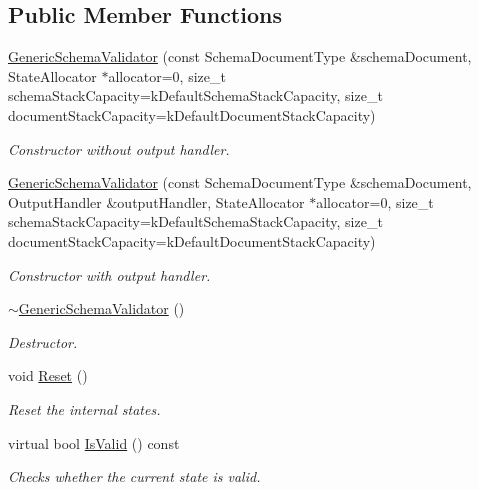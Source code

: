 \subsection*{Public Member Functions}
\begin{DoxyCompactItemize}
\item 
\hyperlink{a02244_a202ee6fdbe5ae9eab3e77a81ecdfeb6d}{Generic\+Schema\+Validator} (const Schema\+Document\+Type \&schema\+Document, State\+Allocator $\ast$allocator=0, size\+\_\+t schema\+Stack\+Capacity=k\+Default\+Schema\+Stack\+Capacity, size\+\_\+t document\+Stack\+Capacity=k\+Default\+Document\+Stack\+Capacity)
\begin{DoxyCompactList}\small\item\em Constructor without output handler. \end{DoxyCompactList}\item 
\hyperlink{a02244_ac2027be8ca55b01cd6f38b45f4e233b4}{Generic\+Schema\+Validator} (const Schema\+Document\+Type \&schema\+Document, Output\+Handler \&output\+Handler, State\+Allocator $\ast$allocator=0, size\+\_\+t schema\+Stack\+Capacity=k\+Default\+Schema\+Stack\+Capacity, size\+\_\+t document\+Stack\+Capacity=k\+Default\+Document\+Stack\+Capacity)
\begin{DoxyCompactList}\small\item\em Constructor with output handler. \end{DoxyCompactList}\item 
\mbox{\label{a02244_a3eab83d483a50efb0c0390adf3291963}} 
\hyperlink{a02244_a3eab83d483a50efb0c0390adf3291963}{$\sim$\+Generic\+Schema\+Validator} ()
\begin{DoxyCompactList}\small\item\em Destructor. \end{DoxyCompactList}\item 
\mbox{\label{a02244_a49efbbe098cb77728be3d48cafed17e4}} 
void \hyperlink{a02244_a49efbbe098cb77728be3d48cafed17e4}{Reset} ()
\begin{DoxyCompactList}\small\item\em Reset the internal states. \end{DoxyCompactList}\item 
\mbox{\label{a02244_a8ebda4da3d8b1fc41e57f15dd62e8f19}} 
virtual bool \hyperlink{a02244_a8ebda4da3d8b1fc41e57f15dd62e8f19}{Is\+Valid} () const
\begin{DoxyCompactList}\small\item\em Checks whether the current state is valid. \end{DoxyCompactList}\item 

\end{DoxyCompactItemize}
